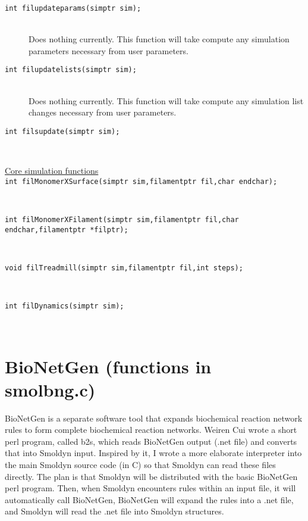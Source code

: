 \documentclass {scrbook}
\newcommand {\ttt} {\texttt}
\begin{document}
\begin{description}
\item[\ttt{int filupdateparams(simptr sim);}]
\hfill \\
Does nothing currently. This function will take compute any simulation parameters necessary from user parameters.

\item[\ttt{int filupdatelists(simptr sim);}]
\hfill \\
Does nothing currently. This function will take compute any simulation list changes necessary from user parameters.

\item[\ttt{int filsupdate(simptr sim);}]
\hfill \\

\item[\underline{Core simulation functions}]

\item[\ttt{int filMonomerXSurface(simptr sim,filamentptr fil,char endchar);}]
\hfill \\

\item[\ttt{int filMonomerXFilament(simptr sim,filamentptr fil,char endchar,filamentptr *filptr);}]
\hfill \\

\item[\ttt{void filTreadmill(simptr sim,filamentptr fil,int steps);}]
\hfill \\

\item[\ttt{int filDynamics(simptr sim);}]
\hfill \\



\end{description}

\section{BioNetGen (functions in smolbng.c)}

BioNetGen is a separate software tool that expands biochemical reaction network rules to form complete biochemical reaction networks. Weiren Cui wrote a short perl program, called b2s, which reads BioNetGen output (.net file) and converts that into Smoldyn input. Inspired by it, I wrote a more elaborate interpreter into the main Smoldyn source code (in C) so that Smoldyn can read these files directly. The plan is that Smoldyn will be distributed with the basic BioNetGen perl program. Then, when Smoldyn encounters rules within an input file, it will automatically call BioNetGen, BioNetGen will expand the rules into a .net file, and Smoldyn will read the .net file into Smoldyn structures.
\end{document}
